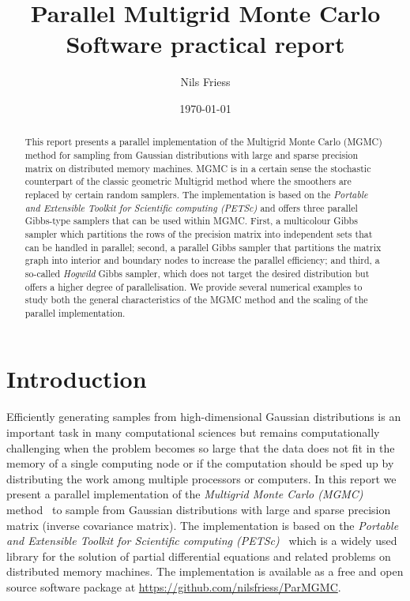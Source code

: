 \documentclass[
fontsize=11pt,
paper=a4,
numbers=noenddot,
parskip=half
]{scrartcl}
\title{Parallel Multigrid Monte Carlo\\
{\normalsize Software practical report}}
\date{\today}
\author{Nils Friess}
\begin{document}
 
\maketitle

\begin{abstract}
    This report presents a parallel implementation of the Multigrid Monte Carlo (MGMC) method for sampling from Gaussian distributions with large and sparse precision matrix on distributed memory machines. MGMC is in a certain sense the stochastic counterpart of the classic geometric Multigrid method where the smoothers are replaced by certain random samplers. The implementation is based on the \emph{Portable and Extensible Toolkit for Scientific computing (PETSc)} and offers three parallel Gibbs-type samplers that can be used within MGMC. First, a multicolour Gibbs sampler which partitions the rows of the precision matrix into independent sets that can be handled in parallel; second, a parallel Gibbs sampler that partitions the matrix graph into interior and boundary nodes to increase the parallel efficiency; and third, a so-called \emph{Hogwild} Gibbs sampler, which does not target the desired distribution but offers a higher degree of parallelisation. We provide several numerical examples to study both the general characteristics of the MGMC method and the scaling of the parallel implementation.
\end{abstract}

\section{Introduction}
Efficiently generating samples from high-dimensional Gaussian distributions is an important task in many computational sciences but remains computationally challenging when the problem becomes so large that the data does not fit in the memory of a single computing node or if the computation should be sped up by distributing the work among multiple processors or computers. In this report we present a parallel implementation of the \emph{Multigrid Monte Carlo (MGMC)} method~\cite{goodmansokal} to sample from Gaussian distributions with large and sparse precision matrix (inverse covariance matrix). The implementation is based on the \emph{Portable and Extensible  Toolkit for Scientific computing (PETSc)}~\cite{petsc-web-page,petsc-user-ref} which is a widely used library for the solution of partial differential equations and related problems on distributed memory machines. The implementation is available as a free and open source software package at \url{https://github.com/nilsfriess/ParMGMC}.
\end{document}
